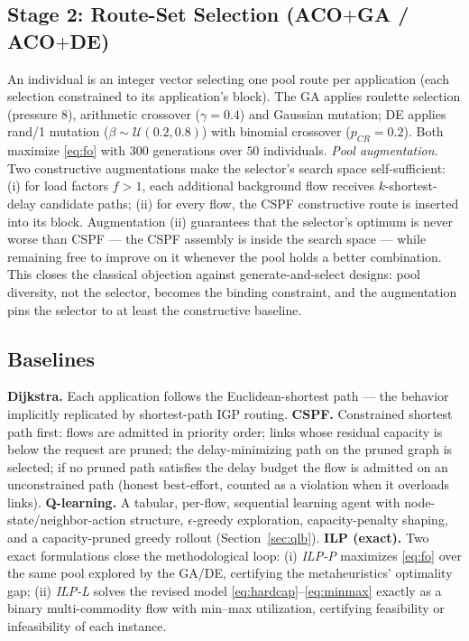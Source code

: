 \documentclass[journal]{IEEEtran}
\begin{document}
\subsection{Stage 2: Route-Set Selection (ACO$+$GA / ACO$+$DE)}
An individual is an integer vector selecting one pool route per application
(each selection constrained to its application's block). The GA applies
roulette selection (pressure 8), arithmetic crossover ($\gamma{=}0.4$) and
Gaussian mutation; DE applies rand/1 mutation
($\beta\sim\mathcal{U}(0.2,0.8)$) with binomial crossover ($p_{CR}{=}0.2$).
Both maximize \eqref{eq:fo} with $300$ generations over $50$ individuals.
\emph{Pool augmentation.} Two constructive augmentations make the selector's
search space self-sufficient: (i) for load factors $f>1$, each additional
background flow receives $k$-shortest-delay candidate paths; (ii) for every
flow, the CSPF constructive route is inserted into its block. Augmentation
(ii) guarantees that the selector's optimum is never worse than CSPF --- the
CSPF assembly is inside the search space --- while remaining free to improve
on it whenever the pool holds a better combination. This closes the
classical objection against generate-and-select designs: pool diversity, not
the selector, becomes the binding constraint, and the augmentation pins the
selector to at least the constructive baseline.

\subsection{Baselines}
\textbf{Dijkstra.} Each application follows the Euclidean-shortest path ---
the behavior implicitly replicated by shortest-path IGP routing.
\textbf{CSPF.} Constrained shortest path first: flows are admitted in
priority order; links whose residual capacity is below the request are
pruned; the delay-minimizing path on the pruned graph is selected; if no
pruned path satisfies the delay budget the flow is admitted on an
unconstrained path (honest best-effort, counted as a violation when it
overloads links).
\textbf{Q-learning.} A tabular, per-flow, sequential learning agent with
node-state/neighbor-action structure, $\epsilon$-greedy exploration,
capacity-penalty shaping, and a capacity-pruned greedy rollout
(Section~\ref{sec:qlb}).
\textbf{ILP (exact).} Two exact formulations close the methodological loop:
(i) \emph{ILP-P} maximizes \eqref{eq:fo} over the same pool explored by the
GA/DE, certifying the metaheuristics' optimality gap; (ii) \emph{ILP-L}
solves the revised model \eqref{eq:hardcap}--\eqref{eq:minmax} exactly as a
binary multi-commodity flow with min--max utilization, certifying
feasibility or infeasibility of each instance.
\end{document}
